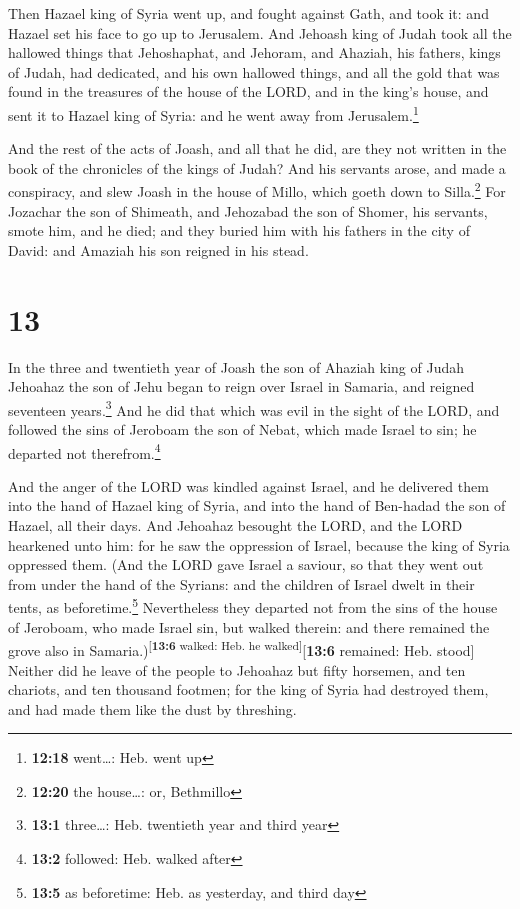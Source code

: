  Then Hazael king of Syria went up, and fought against
Gath, and took it: and Hazael set his face to go up to Jerusalem.
 And Jehoash king of Judah took all the hallowed things
that Jehoshaphat, and Jehoram, and Ahaziah, his fathers, kings of Judah,
had dedicated, and his own hallowed things, and all the gold that was
found in the treasures of the house of the LORD, and in the king's
house, and sent it to Hazael king of Syria: and he went away from
Jerusalem.\footnote{\textbf{12:18} went\ldots: Heb. went up}

 And the rest of the acts of Joash, and all that he did,
are they not written in the book of the chronicles of the kings of
Judah?  And his servants arose, and made a conspiracy,
and slew Joash in the house of Millo, which goeth down to
Silla.\footnote{\textbf{12:20} the house\ldots: or, Bethmillo}
 For Jozachar the son of Shimeath, and Jehozabad the son
of Shomer, his servants, smote him, and he died; and they buried him
with his fathers in the city of David: and Amaziah his son reigned in
his stead.

\hypertarget{section-12}{%
\section{13}\label{section-12}}

 In the three and twentieth year of Joash the son of
Ahaziah king of Judah Jehoahaz the son of Jehu began to reign over
Israel in Samaria, and reigned seventeen years.\footnote{\textbf{13:1}
  three\ldots: Heb. twentieth year and third year}  And he
did that which was evil in the sight of the LORD, and followed the sins
of Jeroboam the son of Nebat, which made Israel to sin; he departed not
therefrom.\footnote{\textbf{13:2} followed: Heb. walked after}

 And the anger of the LORD was kindled against Israel, and
he delivered them into the hand of Hazael king of Syria, and into the
hand of Ben-hadad the son of Hazael, all their days.  And
Jehoahaz besought the LORD, and the LORD hearkened unto him: for he saw
the oppression of Israel, because the king of Syria oppressed them.
 (And the LORD gave Israel a saviour, so that they went
out from under the hand of the Syrians: and the children of Israel dwelt
in their tents, as beforetime.\footnote{\textbf{13:5} as beforetime:
  Heb. as yesterday, and third day}  Nevertheless they
departed not from the sins of the house of Jeroboam, who made Israel
sin, but walked therein: and there remained the grove also in
Samaria.)\textsuperscript{{[}\textbf{13:6} walked: Heb. he
walked{]}}{[}\textbf{13:6} remained: Heb. stood{]} 
Neither did he leave of the people to Jehoahaz but fifty horsemen, and
ten chariots, and ten thousand footmen; for the king of Syria had
destroyed them, and had made them like the dust by threshing.

